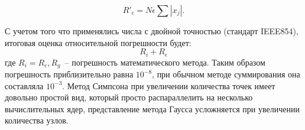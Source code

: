 \begin{equation}
R'_{\epsilon} =N\epsilon\sum|x_j|.
\end{equation}


С учетом того что применялись числа с двойной точностью (стандарт IEEE854), итоговая оценка относительной погрешности будет: 
\begin{equation}
 R_i+R_{\epsilon}
\end{equation}
где $R_i = R_c, R_g$~-- погрешность математического метода. Таким образом погрешность приблизительно равна $10^{-8}$, при обычном методе суммирования она составляла $10^{-3}$. Метод Симпсона при увеличении количества точек имеет довольно простой вид, который просто распараллелить на несколько вычислительных ядер, представление метода Гаусса усложняется при увеличении количества узлов.

